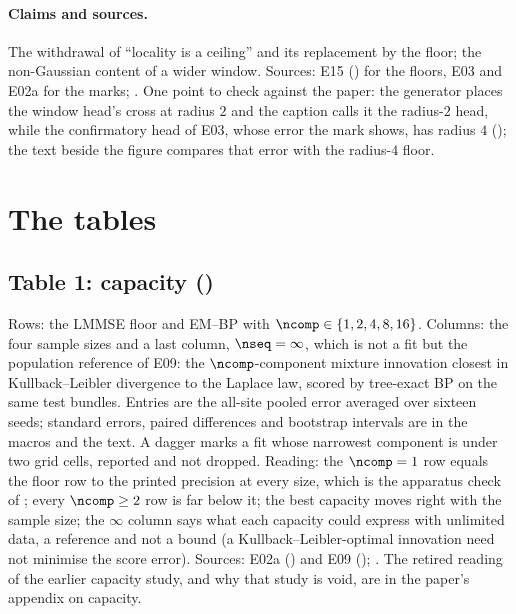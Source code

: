 \paragraph{Claims and sources.} The withdrawal of ``locality is a ceiling'' and its
replacement by the floor; the non-Gaussian content of a wider window. Sources: E15
() for the floors, E03 and E02a for the marks;
. One point to check against the paper: the
generator places the window head's cross at radius $2$ and the caption calls it the
radius-$2$ head, while the confirmatory head of E03, whose error the mark shows, has
radius $4$ (); the text beside the figure compares that
error with the radius-$4$ floor.

\section{The tables}
\label{sec:tables}

\subsection{Table 1: capacity ()}

Rows: the LMMSE floor and EM--BP with $\ncomp\in\{1,2,4,8,16\}$. Columns: the four sample
sizes and a last column, $\nseq=\infty$, which is not a fit but the population reference
of E09: the $\ncomp$-component mixture innovation closest in Kullback--Leibler divergence
to the Laplace law, scored by tree-exact BP on the same test bundles. Entries are the
all-site pooled error averaged over sixteen seeds; standard errors, paired differences
and bootstrap intervals are in the macros and the text. A dagger marks a fit whose
narrowest component is under two grid cells, reported and not dropped. Reading: the
$\ncomp=1$ row equals the floor row to the printed precision at every size, which is the
apparatus check of ; every $\ncomp\ge2$ row is far
below it; the best capacity moves right with the sample size; the $\infty$ column says
what each capacity could express with unlimited data, a reference and not a bound
(a Kullback--Leibler-optimal innovation need not minimise the score error). Sources:
E02a () and E09 ();
. The retired reading of the earlier capacity
study, and why that study is void, are in the paper's appendix on capacity.

